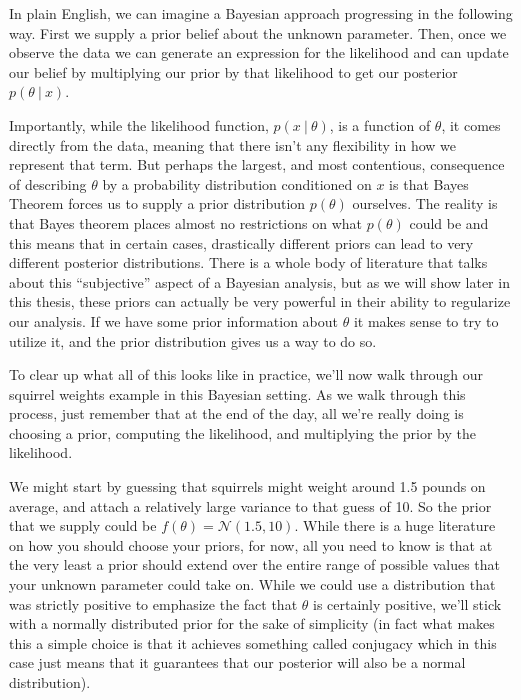 \documentclass[12pt,twoside]{reedthesis}
\begin{document}
In plain English, we can imagine a Bayesian approach progressing in the following way. First we supply a prior belief about the unknown parameter. Then, once we observe the data we can generate an expression for the likelihood and can update our belief by multiplying our prior by that likelihood to get our posterior \(p(\theta \ | \ x)\).

Importantly, while the likelihood function, \(p(x \ | \ \theta)\), is a function of \(\theta\), it comes directly from the data, meaning that there isn't any flexibility in how we represent that term. But perhaps the largest, and most contentious, consequence of describing \(\theta\) by a probability distribution conditioned on \(x\) is that Bayes Theorem forces us to supply a prior distribution \(p(\theta)\) ourselves. The reality is that Bayes theorem places almost no restrictions on what \(p(\theta)\) could be and this means that in certain cases, drastically different priors can lead to very different posterior distributions. There is a whole body of literature that talks about this ``subjective'' aspect of a Bayesian analysis, but as we will show later in this thesis, these priors can actually be very powerful in their ability to regularize our analysis. If we have some prior information about \(\theta\) it makes sense to try to utilize it, and the prior distribution gives us a way to do so.

To clear up what all of this looks like in practice, we'll now walk through our squirrel weights example in this Bayesian setting. As we walk through this process, just remember that at the end of the day, all we're really doing is choosing a prior, computing the likelihood, and multiplying the prior by the likelihood.

We might start by guessing that squirrels might weight around 1.5 pounds on average, and attach a relatively large variance to that guess of 10. So the prior that we supply could be \(f(\theta) = \mathcal{N}(1.5,10)\). While there is a huge literature on how you should choose your priors, for now, all you need to know is that at the very least a prior should extend over the entire range of possible values that your unknown parameter could take on. While we could use a distribution that was strictly positive to emphasize the fact that \(\theta\) is certainly positive, we'll stick with a normally distributed prior for the sake of simplicity (in fact what makes this a simple choice is that it achieves something called conjugacy which in this case just means that it guarantees that our posterior will also be a normal distribution).
\end{document}
